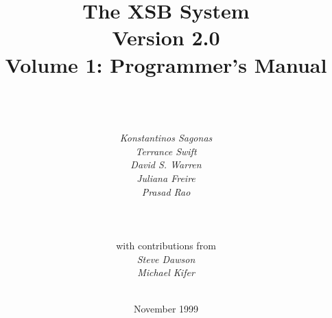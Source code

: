 \documentclass[11pt]{report}
\newcommand{\version}{Version 2.0}
\begin{document}
\title{\bf The XSB System \\ \version \\ Volume 1: Programmer's Manual}

\author{{\epsfxsize=230pt }\\
	\ \\ \ \\
	{\em Konstantinos Sagonas} \\
	{\em Terrance Swift} \\
	{\em David S. Warren} \\ 
	{\em Juliana Freire} \\
	{\em Prasad Rao} \\
	\ \\ \\ \\
	{\normalsize with contributions from} \\
	{\em Steve Dawson} \\
	{\em Michael Kifer} \\
	\ \\
} 

\date{November 1999}

\maketitle

\thispagestyle{empty}

\newpage
\thispagestyle{empty}
%

\tableofcontents
\newpage	%
  











%
%
%
%
%

%

\appendix



%

%




\printindex
\end{document}
